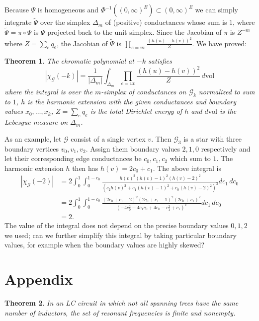 \documentclass[12pt]{amsart}
\newtheorem{theorem}{Theorem}
\newcommand{\G}{{\mathcal G}}
\newcommand{\be}{\begin{equation}}
\newcommand{\ee}{\end{equation}}
\begin{document}
Because $\Psi$ is homogeneous and $\Phi^{-1} ((0,\infty) ^E) \subset (0,\infty)^E$ we can simply integrate $\tilde\Psi$
over the simplex $\Delta_m$ of (positive) conductances whose sum is $1$, where $\tilde\Psi=\pi\circ\Psi$ is $\Psi$ projected back to the 
unit simplex. Since the Jacobian of $\pi$ is $Z^{-m}$ where $Z=\sum_e q_e$, the Jacobian of $\tilde\Psi$ is $\prod_{e=uv}\frac{(h(u)-h(v))^2}{Z}$.
We have proved:

\begin{theorem}\label{integralthm} The chromatic polynomial at $-k$ satisfies
\be\label{intform}
|\chi_{\G}(-k)| = \frac1{|\Delta_m|}\int_{\Delta_m} \prod_{e=uv}\frac{(h(u)-h(v))^2}{Z} \,d\mathrm{vol}\ee
where the integral is over the $m$-simplex of conductances on $\G_k$ normalized to sum to $1$, $h$ is the harmonic extension with the given conductances and boundary values $x_0,\dots,x_k$,
$Z=\sum_e q_e$ is the total Dirichlet energy of $h$ and $d\mathrm{vol}$ is the Lebesgue measure on $\Delta_m$.
\end{theorem}

As an example, let $\G$ consist of a single vertex $v$. Then $\G_3$ is a star with three boundary vertices $v_0,v_1,v_2$. 
Assign them boundary values $2,1,0$ respectively
and let their corresponding edge conductances be $c_0,c_1,c_2$ which sum to $1$. The harmonic extension $h$ then 
has $h(v) = 2c_0+c_1$.
The above integral is
\begin{align*}
|\chi_{\G}(-2)|&=2\int_0^1\int_0^{1-c_0}\frac{h(v)^2(h(v)-1)^2(h(v)-2)^2}{(c_2h(v)^2+c_1(h(v)-1)^2+c_0(h(v)-2)^2)^3}dc_1\,dc_0\\
&=2\int_0^1\int_0^{1-c_0}\frac{(2 c_0+c_1-2)^2(2 c_0+c_1-1)^2(2c_0+c_1)^2}{(-4 c_0^2-4 c_1 c_0+4 c_0-c_1^2+c_1)^3}
dc_1\,dc_0\\
   &= 2.\end{align*}
The value of the integral does not depend on the precise boundary values $0,1,2$ we used; can we further simplify
this integral by taking particular boundary values, for example when the boundary values are highly skewed?

\section{Appendix}

\begin{theorem}\label{resonant} In an LC circuit in which not all spanning trees have the same number of inductors, the set of resonant frequencies is finite and nonempty.
\end{theorem}
\end{document}
